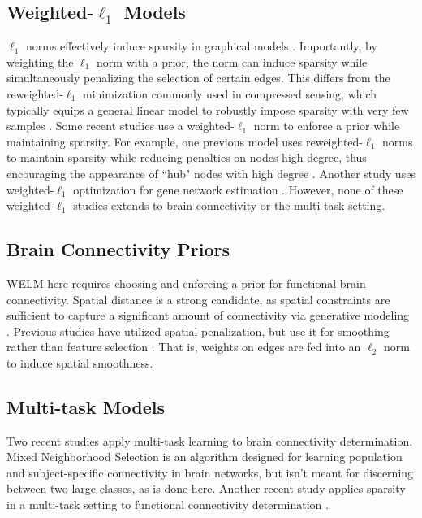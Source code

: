\documentclass{article}
\begin{document}
\subsection{Weighted-$\ell_1$ Models}
\label{weighted_penalization}

$\ell_1$ norms effectively induce sparsity in graphical models \cite{friedman2008sparse}. Importantly, by weighting the $\ell_1$ norm with a prior, the norm can induce sparsity while simultaneously penalizing the selection of certain edges. This differs from the reweighted-$\ell_1$ minimization commonly used in compressed sensing, which typically equips a general linear model to robustly impose sparsity with very few samples \cite{candes2008enhancing}. Some recent studies use a weighted-$\ell_1$ norm to enforce a prior while maintaining sparsity. For example, one previous model uses reweighted-$\ell_1$ norms to maintain sparsity while reducing penalties on nodes high degree, thus encouraging the appearance of ``hub" nodes with high degree \cite{liu2011learning}. Another study uses weighted-$\ell_1$ optimization for gene network estimation \cite{shimamura2007weighted}. However, none of these weighted-$\ell_1$ studies extends to brain connectivity or the multi-task setting.

\subsection{Brain Connectivity Priors}
WELM here requires choosing and enforcing a prior for functional brain connectivity. Spatial distance is a strong candidate, as spatial constraints are sufficient to capture a significant amount of connectivity via generative modeling \cite{vertes2012simple}. Previous studies have utilized spatial penalization, but use it for smoothing rather than feature selection \cite{baldassano2012voxel,ng2011generalized,grosenick2011family}. That is, weights on edges are fed into an $\ell_2$ norm to induce spatial smoothness.

\subsection{Multi-task Models}
\label{multi-task_models}
Two recent studies apply multi-task learning to brain connectivity determination. Mixed Neighborhood Selection \cite{monti2015learning} is an algorithm designed for learning population and subject-specific connectivity in brain networks, but isn't meant for discerning between two large classes, as is done here. Another recent study applies sparsity in a multi-task setting to functional connectivity determination \cite{ng2013novel}.
\end{document}
